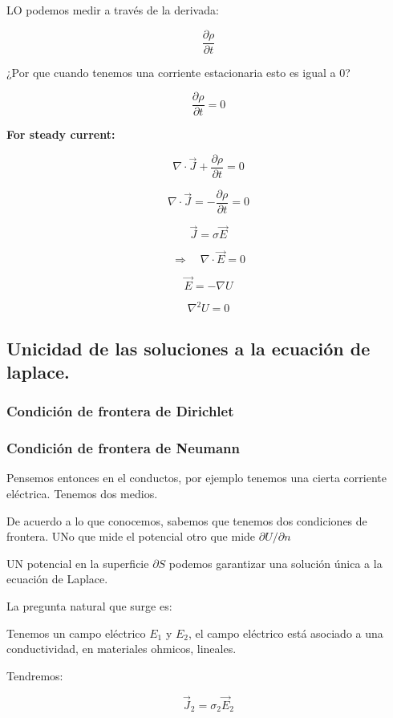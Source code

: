 \documentclass{article}
\begin{document}
LO podemos medir a través de la derivada:


\[  \frac{\partial \rho}{\partial t} \]


¿Por que cuando tenemos una corriente estacionaria esto es igual a $0$?


\[  \frac{\partial \rho}{\partial t} =0  \]


\textbf{For steady current:}


\[ {\nabla} \cdot \vec{J} + \frac{\partial \rho}{\partial t}  =0\]

\[ \nabla \cdot \vec{J} = - \frac{\partial \rho}{\partial t} =0   \]


\[ \vec{J} =   \sigma \vec{E}  \]


\[ \Rightarrow \quad \nabla \cdot \vec{E} =0 \]


\[   \vec{E} = -\nabla{U}    \]


\[ \nabla^{2}U =0  \]


\subsection{Unicidad de las soluciones a la ecuación de laplace.}


\subsubsection{Condición de frontera de Dirichlet}


\subsubsection{Condición de frontera de Neumann}


Pensemos entonces en el conductos, por ejemplo tenemos una cierta corriente eléctrica. Tenemos dos medios.


De acuerdo a lo que conocemos, sabemos que tenemos dos condiciones de frontera. UNo que mide el potencial otro que mide $\partial U / \partial n$


UN potencial en la superficie $\partial S$ podemos garantizar una solución única a la ecuación de Laplace. 


La pregunta natural que surge es:


Tenemos un campo eléctrico $E_{1}$ y $E_{2}$, el campo eléctrico está asociado a una conductividad, en materiales ohmicos, lineales.


Tendremos:

\[  \vec{J}_{2} = \sigma_{2}\vec{E}_{2}  \]
\end{document}
